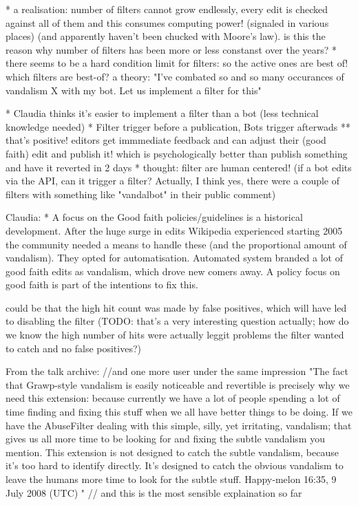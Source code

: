 
* a realisation: number of filters cannot grow endlessly, every edit is checked against all of them and this consumes computing power! (signaled in various places) (and apparently haven't been chucked with Moore's law). is this the reason why number of filters has been more or less constanst over the years?
* there seems to be a hard condition limit for filters: so the active ones are best of! which filters are best-of? a theory: "I've combated so and so many occurances of vandalism X with my bot. Let us implement a filter for this"

* Claudia thinks it's easier to implement a filter than a bot (less technical knowledge needed)
* Filter trigger before a publication, Bots trigger afterwads
  ** that's positive! editors get immmediate feedback and can adjust their (good faith) edit and publish it! which is psychologically better than publish something and have it reverted in 2 days
* thought: filter are human centered! (if a bot edits via the API, can it trigger a filter? Actually, I think yes, there were a couple of filters with something like "vandalbot" in their public comment)

Claudia: * A focus on the Good faith policies/guidelines is a historical development. After the huge surge in edits Wikipedia experienced starting 2005 the community needed a means to handle these (and the proportional amount of vandalism). They opted for automatisation. Automated system branded a lot of good faith edits as vandalism, which drove new comers away. A policy focus on good faith is part of the intentions to fix this.

 could be that the high hit count was made by false positives, which will have led to disabling the filter (TODO: that's a very interesting question actually; how do we know the high number of hits were actually leggit problems the filter wanted to catch and no false positives?)

 From the talk archive:
//and one more user under the same impression
"The fact that Grawp-style vandalism is easily noticeable and revertible is precisely why we need this extension: because currently we have a lot of people spending a lot of time finding and fixing this stuff when we all have better things to be doing. If we have the AbuseFilter dealing with this simple, silly, yet irritating, vandalism; that gives us all more time to be looking for and fixing the subtle vandalism you mention. This extension is not designed to catch the subtle vandalism, because it's too hard to identify directly. It's designed to catch the obvious vandalism to leave the humans more time to look for the subtle stuff. Happy‑melon 16:35, 9 July 2008 (UTC) "
// and this is the most sensible explaination so far
\cite{GeiRib2010}

